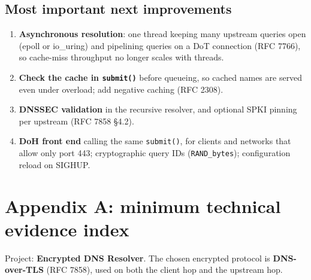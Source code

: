 \documentclass[11pt,a4paper]{article}
\newcommand{\code}[1]{\texttt{#1}}
\begin{document}
\subsection{Most important next improvements}
\begin{enumerate}
  \item \textbf{Asynchronous resolution}: one thread keeping many upstream queries open (epoll or io\_uring)
  and pipelining queries on a DoT connection (RFC 7766), so cache-miss throughput no longer scales with threads.
  \item \textbf{Check the cache in \code{submit()}} before queueing, so cached names are served even under
  overload; add negative caching (RFC 2308).
  \item \textbf{DNSSEC validation} in the recursive resolver, and optional SPKI pinning per upstream (RFC 7858
  \S4.2).
  \item \textbf{DoH front end} calling the same \code{submit()}, for clients and networks that allow only port
  443; cryptographic query IDs (\code{RAND\_bytes}); configuration reload on SIGHUP.
\end{enumerate}

\setcounter{secnumdepth}{0}
\section{Appendix A: minimum technical evidence index}

Project: \textbf{Encrypted DNS Resolver}. The chosen encrypted protocol is \textbf{DNS-over-TLS} (RFC 7858),
used on both the client hop and the upstream hop.
\end{document}

